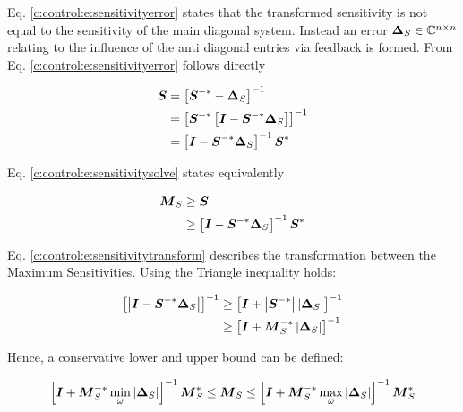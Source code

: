 Eq. \ref{c:control:e:sensitivityerror} states that the transformed sensitivity is not equal to the sensitivity of the main diagonal system. Instead an error $\mbox{\boldmath$\Delta$}_{S} \in \mathbb{C}^{n \times n}$ relating to the influence of the anti diagonal entries via feedback is formed. From Eq. \ref{c:control:e:sensitivityerror} follows directly

\begin{align}
\begin{split}
\mbox{\boldmath$S$} &= \left[ \mbox{\boldmath$S$}^{-*}- \mbox{\boldmath$\Delta$}_{S}\right]^{-1} \\
&= \left[ \mbox{\boldmath$S$}^{-*}\left[ \mbox{\boldmath$I$} - \mbox{\boldmath$S$}^{-*}\mbox{\boldmath$\Delta$}_S\right] \right]^{-1} \\
&= \left[ \mbox{\boldmath$I$} - \mbox{\boldmath$S$}^{-*}\mbox{\boldmath$\Delta$}_S\right]^{-1} \mbox{\boldmath$S$}^{*}
\end{split}
\label{c:control:e:sensitivitysolve}
\end{align}

Eq. \ref{c:control:e:sensitivitysolve} states equivalently

\begin{align}
\begin{split}
\mbox{\boldmath$M$}_S &\geq \mbox{\boldmath$S$} \\
&\geq \left[ \mbox{\boldmath$I$} - \mbox{\boldmath$S$}^{-*}\mbox{\boldmath$\Delta$}_S\right]^{-1} \mbox{\boldmath$S$}^{*}
\end{split}
\label{c:control:e:sensitivitytransform}
\end{align}

Eq. \ref{c:control:e:sensitivitytransform} describes the transformation between the Maximum Sensitivities. 
Using the Triangle inequality holds:

\begin{align}
\begin{split}
\left[\left| \mbox{\boldmath$I$} - \mbox{\boldmath$S$}^{-*} \mbox{\boldmath$\Delta$}_S  \right| \right]^{-1} &\geq \left[\mbox{\boldmath$I$} + \left|\mbox{\boldmath$S$}^{-*} \right| \left| \mbox{\boldmath$\Delta$}_S  \right| \right]^{-1} \\
&\geq \left[\mbox{\boldmath$I$} + \mbox{\boldmath$M$}_S^{-*} \left| \mbox{\boldmath$\Delta$}_S  \right| \right]^{-1} 
\end{split}
\end{align}

Hence, a conservative lower and upper bound can be defined:

\begin{align}
\begin{split}
\left[\mbox{\boldmath$I$} + \mbox{\boldmath$M$}_S^{-*} \min_\omega \left|\mbox{\boldmath$\Delta$}_{S}\right| \right]^{-1} \mbox{\boldmath$M$}_S^{*}\leq \mbox{\boldmath$M$}_S \leq 
\left[\mbox{\boldmath$I$} + \mbox{\boldmath$M$}_S^{-*} \max_\omega \left|\mbox{\boldmath$\Delta$}_{S}\right| \right]^{-1} \mbox{\boldmath$M$}_S^{*}
\end{split}
\label{c:control:e:sensitivitytransformBounds}
\end{align}

